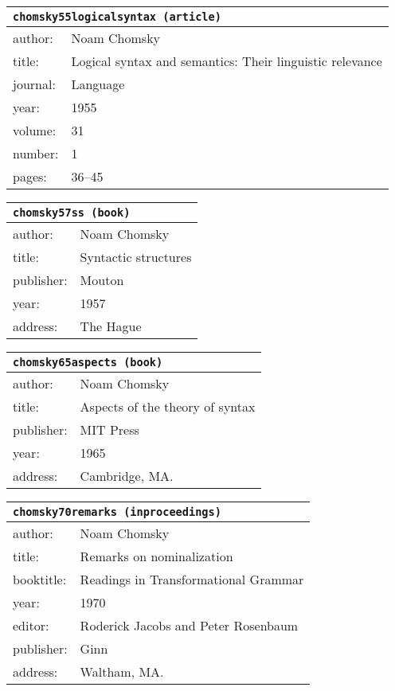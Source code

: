 \documentclass{article}
\begin{document}
\bigskip

\begin{tabular}{p{}p{}}
\multicolumn{2}{l}{\texttt{chomsky55logicalsyntax (article)}}\\
\hline
author: & Noam Chomsky\\
title: & Logical syntax and semantics: Their linguistic relevance\\
journal: & Language\\
year: & 1955\\
volume: & 31\\
number: & 1\\
pages: & 36--45\\
\end{tabular}

\bigskip

\begin{tabular}{p{}p{}}
\multicolumn{2}{l}{\texttt{chomsky57ss (book)}}\\
\hline
author: & Noam Chomsky\\
title: & Syntactic structures\\
publisher: & Mouton\\
year: & 1957\\
address: & The Hague\\
\end{tabular}

\bigskip

\begin{tabular}{p{}p{}}
\multicolumn{2}{l}{\texttt{chomsky65aspects (book)}}\\
\hline
author: & Noam Chomsky\\
title: & Aspects of the theory of syntax\\
publisher: & MIT Press\\
year: & 1965\\
address: & Cambridge, MA.\\
\end{tabular}

\bigskip

\begin{tabular}{p{}p{}}
\multicolumn{2}{l}{\texttt{chomsky70remarks (inproceedings)}}\\
\hline
author: & Noam Chomsky\\
title: & Remarks on nominalization\\
booktitle: & Readings in Transformational Grammar\\
year: & 1970\\
editor: & Roderick Jacobs and Peter Rosenbaum\\
publisher: & Ginn\\
address: & Waltham, MA.\\
\end{tabular}
\end{document}
